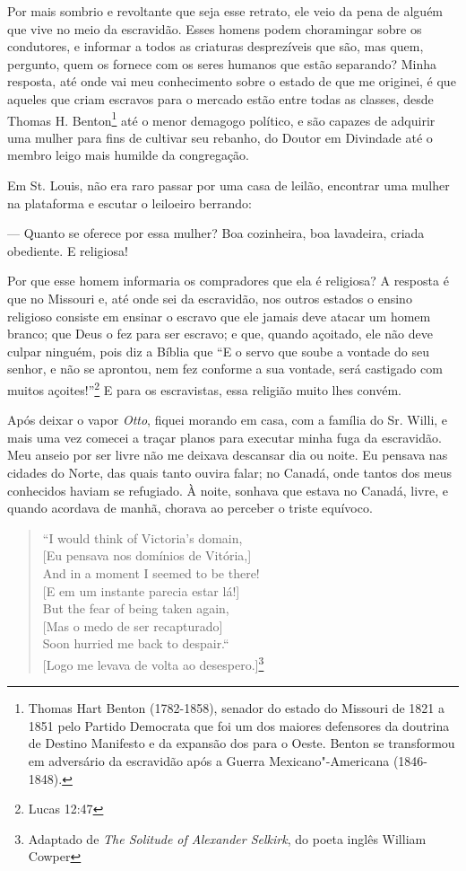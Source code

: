 Por mais sombrio e revoltante que seja esse retrato, ele veio da pena de
alguém que vive no meio da escravidão. Esses homens podem choramingar
sobre os condutores, e informar a todos as criaturas desprezíveis que
são, mas quem, pergunto, quem os fornece com os seres humanos que estão
separando? Minha resposta, até onde vai meu conhecimento sobre o estado
de que me originei, é que aqueles que criam escravos para o mercado
estão entre todas as classes, desde Thomas H. Benton\footnote{Thomas
  Hart Benton (1782-1858), senador do estado do Missouri de 1821 a 1851
  pelo Partido Democrata que foi um dos maiores defensores da doutrina
  de Destino Manifesto e da expansão dos  para o Oeste. Benton se
  transformou em adversário da escravidão após a Guerra
  Mexicano"-Americana (1846-1848).} até o menor demagogo político, e são
capazes de adquirir uma mulher para fins de cultivar seu rebanho, do
Doutor em Divindade até o membro leigo mais humilde da congregação.

Em St. Louis, não era raro passar por uma casa de leilão, encontrar uma
mulher na plataforma e escutar o leiloeiro berrando:

--- Quanto se oferece por essa mulher? Boa cozinheira, boa lavadeira,
criada obediente. E religiosa!

Por que esse homem informaria os compradores que ela é religiosa? A
resposta é que no Missouri e, até onde sei da escravidão, nos outros
estados o ensino religioso consiste em ensinar o escravo que ele jamais
deve atacar um homem branco; que Deus o fez para ser escravo; e que,
quando açoitado, ele não deve culpar ninguém, pois diz a Bíblia que ``E
o servo que soube a vontade do seu senhor, e não se aprontou, nem fez
conforme a sua vontade, será castigado com muitos açoites!''\footnote{Lucas
  12:47} E para os escravistas, essa religião muito lhes convém.

Após deixar o vapor \emph{Otto}, fiquei morando em casa, com a família
do Sr. Willi, e mais uma vez comecei a traçar planos para executar minha
fuga da escravidão. Meu anseio por ser livre não me deixava descansar
dia ou noite. Eu pensava nas cidades do Norte, das quais tanto ouvira
falar; no Canadá, onde tantos dos meus conhecidos haviam se refugiado. À
noite, sonhava que estava no Canadá, livre, e quando acordava de manhã,
chorava ao perceber o triste equívoco.

\begin{verse}
``I would think of Victoria's domain,\\
{[}Eu pensava nos domínios de Vitória,{]}\\
And in a moment I seemed to be there!\\
{[}E em um instante parecia estar lá!{]}\\
But the fear of being taken again,\\
{[}Mas o medo de ser recapturado{]}\\
Soon hurried me back to despair.``\\
{[}Logo me levava de volta ao
desespero.{]}\footnote{Adaptado de \emph{The Solitude of Alexander
  Selkirk}, do poeta inglês William Cowper}
\end{verse}

